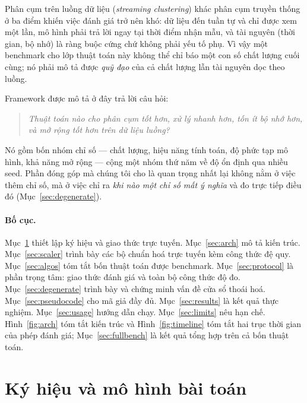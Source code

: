 \documentclass[11pt,a4paper]{article}
\theoremstyle{remark}
\begin{document}
Phân cụm trên luồng dữ liệu (\emph{streaming clustering}) khác phân cụm truyền
thống ở ba điểm khiến việc đánh giá trở nên khó: dữ liệu đến tuần tự và chỉ được
xem một lần, mô hình phải trả lời ngay tại thời điểm nhận mẫu, và tài nguyên
(thời gian, bộ nhớ) là ràng buộc cứng chứ không phải yếu tố phụ. Vì vậy một
benchmark cho lớp thuật toán này không thể chỉ báo một con số chất lượng cuối
cùng; nó phải mô tả được \emph{quỹ đạo} của cả chất lượng lẫn tài nguyên dọc
theo luồng.

Framework được mô tả ở đây trả lời câu hỏi:

\begin{quote}
\itshape
Thuật toán nào cho phân cụm tốt hơn, xử lý nhanh hơn, tốn ít bộ nhớ hơn, và
mở rộng tốt hơn trên dữ liệu luồng?
\end{quote}

Nó gồm bốn nhóm chỉ số --- chất lượng, hiệu năng tính toán, độ phức tạp mô
hình, khả năng mở rộng --- cộng một nhóm thứ năm về độ ổn định qua nhiều seed.
Phần đóng góp mà chúng tôi cho là quan trọng nhất lại không nằm ở việc thêm chỉ
số, mà ở việc chỉ ra \emph{khi nào một chỉ số mất ý nghĩa} và đo trực tiếp điều
đó (Mục~\ref{sec:degenerate}).

\paragraph{Bố cục.}
Mục~\ref{sec:notation} thiết lập ký hiệu và giao thức trực tuyến.
Mục~\ref{sec:arch} mô tả kiến trúc.
Mục~\ref{sec:scaler} trình bày các bộ chuẩn hoá trực tuyến kèm công thức đệ quy.
Mục~\ref{sec:algos} tóm tắt bốn thuật toán được benchmark.
Mục~\ref{sec:protocol} là phần trọng tâm: giao thức đánh giá và toàn bộ công
thức độ đo.
Mục~\ref{sec:degenerate} trình bày và chứng minh vấn đề cửa sổ thoái hoá.
Mục~\ref{sec:pseudocode} cho mã giả đầy đủ.
Mục~\ref{sec:results} là kết quả thực nghiệm.
Mục~\ref{sec:usage} hướng dẫn chạy.
Mục~\ref{sec:limits} nêu hạn chế.
Hình~\ref{fig:arch} tóm tắt kiến trúc và Hình~\ref{fig:timeline} tóm tắt hai
trục thời gian của phép đánh giá; Mục~\ref{sec:fullbench} là kết quả tổng hợp
trên cả bốn thuật toán.

\section{Ký hiệu và mô hình bài toán}
\label{sec:notation}
\end{document}
